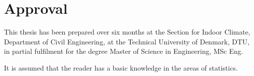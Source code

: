 \section*{Approval}
This thesis has been prepared over six months at the Section for
Indoor Climate, Department of Civil Engineering, at the Technical
University of Denmark, DTU, in partial fulfilment for the degree
Master of Science in Engineering, MSc Eng.

It is assumed that the reader has a basic knowledge in the areas of statistics.

\vfill

\begin{center}
  \namesigdate{\thesisauthor~-~\studentnumber}
\end{center}

\vfill
